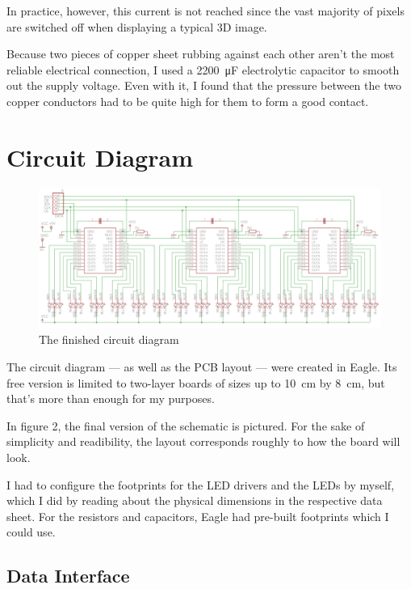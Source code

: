 \documentclass[a4paper, 11pt, titlepage]{report}
\begin{document}
In practice, however, this current is not reached since the vast majority of pixels are
switched off when displaying a typical 3D image.

Because two pieces of copper sheet rubbing against each other aren't the most reliable electrical
connection, I used a \SI{2200}{\micro\farad} electrolytic capacitor to smooth out the supply
voltage. Even with it, I found that the pressure between the two copper conductors had to be quite
high for them to form a good contact.


\newpage
\section{Circuit Diagram}

\begin{figure}[h]
\vspace{4mm}
\includegraphics[width=\textwidth]{./images/schematic.png}
\vspace{-8mm}
\caption{The finished circuit diagram}
\vspace{6mm}
\end{figure}

The circuit diagram --- as well as the PCB layout --- were created in Eagle. Its free version is
limited to two-layer boards of sizes up to \SI{10}{\centi\meter} by \SI{8}{\centi\meter}, but
that's more than enough for my purposes.

In figure 2, the final version of the schematic is pictured. For the sake of simplicity and
readibility, the layout corresponds roughly to how the board will look.

I had to configure the footprints for the LED drivers and the LEDs by myself, which I did by
reading about the physical dimensions in the respective data sheet. For the resistors and
capacitors, Eagle had pre-built footprints which I could use.

\subsection{Data Interface}
\end{document}
